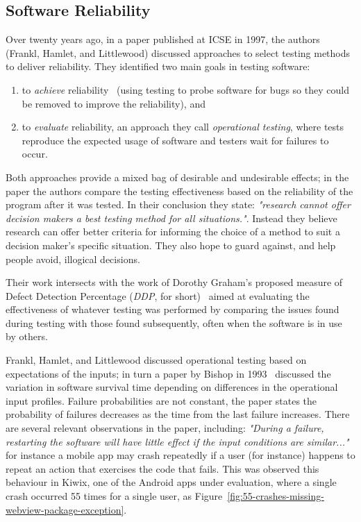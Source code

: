 \subsection{Software Reliability}
Over twenty years ago, in a paper published at ICSE in 1997, the authors (Frankl, Hamlet, and Littlewood) discussed approaches to select testing methods to deliver reliability. They identified two main goals in testing software: 
\begin{enumerate}
    \item to \emph{achieve} reliability~\cite{frankl1997choosing_testing_for_reliability} (using testing to probe software for bugs so they could be removed to improve the reliability), and 
    \item to \emph{evaluate} reliability, an approach they call \emph{operational testing}, where tests reproduce the expected usage of software and testers wait for failures to occur.
\end{enumerate}

Both approaches provide a mixed bag of desirable and undesirable effects; in the paper the authors compare the testing effectiveness based on the reliability of the program after it was tested. In their conclusion they state: \emph{"research cannot offer decision makers a best testing method for all situations."}. Instead they believe research can offer better criteria for informing the choice of a method to suit a decision maker's specific situation. They also hope to guard against, and help people avoid, illogical decisions.

Their work intersects with the work of Dorothy Graham's proposed measure of Defect Detection Percentage (\emph{DDP}, for short)~\cite{graham_measuring_2009} aimed at evaluating the effectiveness of whatever testing was performed by comparing the issues found during testing with those found subsequently, often when the software is in use by others.

Frankl, Hamlet, and Littlewood discussed operational testing based on expectations of the inputs; in turn a paper by Bishop in 1993~\cite{bishop1993variation} discussed the variation in software survival time depending on differences in the operational input profiles. Failure probabilities are not constant, the paper states the probability of failures decreases as the time from the last failure increases. There are several relevant observations in the paper, including: \emph{"During a failure, restarting the software will have little effect if the input conditions are similar..."} for instance a mobile app may crash repeatedly if a user (for instance) happens to repeat an action that exercises the code that fails. This was observed this behaviour in Kiwix, one of the Android apps under evaluation, where a single crash occurred 55 times for a single user, as Figure~\ref{fig:55-crashes-missing-webview-package-exception}.

